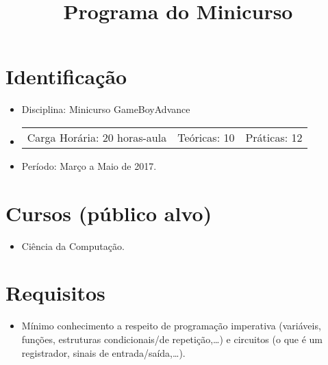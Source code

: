 \documentclass{article}
\title{Programa do Minicurso}
\author{}
\date{}
\begin{document}
\maketitle

\section{Identificação}

\begin{itemize}
    \item[] Disciplina: Minicurso GameBoyAdvance
    \item[]
        \hspace{-1em}
        \begin{tabular}{ccc}
            Carga Horária: 20 horas-aula&
            Teóricas: 10&
            Práticas: 12
        \end{tabular}
    \item[] Período: Março a Maio de 2017.
\end{itemize}

\section{Cursos (público alvo)}
\begin{itemize}
    \item[] Ciência da Computação.
\end{itemize}

\section{Requisitos}
\begin{itemize}
    \item[] Mínimo conhecimento a respeito de programação imperativa
        (variáveis, funções, estruturas condicionais/de repetição,\ldots) e
        circuitos (o que é um registrador, sinais de entrada/saída,\ldots).
\end{itemize}
\end{document}
